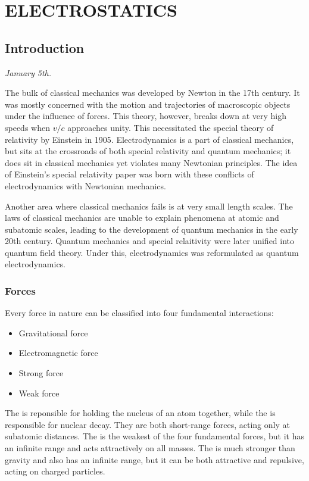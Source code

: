 \chapter{ELECTROSTATICS}

\section{Introduction}

\textit{January 5th.}

The bulk of classical mechanics was developed by Newton in the 17th century. It was mostly concerned with the motion and trajectories of macroscopic objects under the influence of forces. This theory, however, breaks down at very high speeds when $v/c$ approaches unity. This necessitated the special theory of relativity by Einstein in 1905. Electrodynamics is a part of classical mechanics, but sits at the crossroads of both special relativity and quantum mechanics; it does sit in classical mechanics yet violates many Newtonian principles. The idea of Einstein's special relativity paper was born with these conflicts of electrodynamics with Newtonian mechanics.

Another area where classical mechanics fails is at very small length scales. The laws of classical mechanics are unable to explain phenomena at atomic and subatomic scales, leading to the development of quantum mechanics in the early 20th century. Quantum mechanics and special relaitivity were later unified into quantum field theory. Under this, electrodynamics was reformulated as quantum electrodynamics.

\subsection{Forces}

Every force in nature can be classified into four fundamental interactions:
\begin{itemize}
    \item Gravitational force
    \item Electromagnetic force
    \item Strong force
    \item Weak force
\end{itemize}
The  is reponsible for holding the nucleus of an atom together, while the  is responsible for nuclear decay. They are both short-range forces, acting only at subatomic distances. The  is the weakest of the four fundamental forces, but it has an infinite range and acts attractively on all masses. The  is much stronger than gravity and also has an infinite range, but it can be both attractive and repulsive, acting on charged particles.

